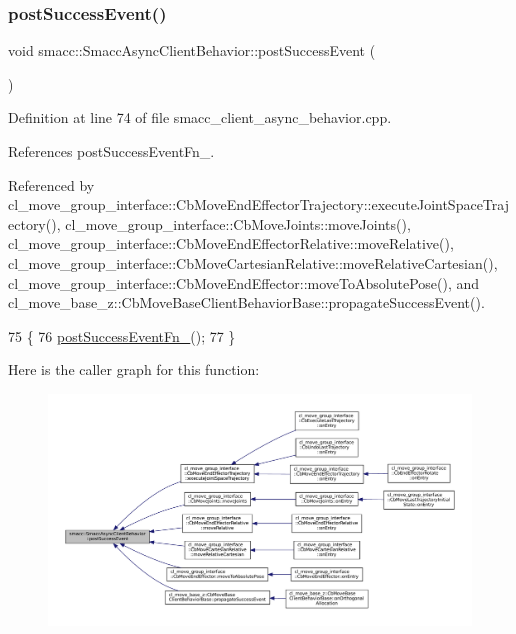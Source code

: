 \subsubsection{\texorpdfstring{post\+Success\+Event()}{postSuccessEvent()}}
{\footnotesize\ttfamily void smacc\+::\+Smacc\+Async\+Client\+Behavior\+::post\+Success\+Event (\begin{DoxyParamCaption}{ }\end{DoxyParamCaption})\hspace{0.3cm}{\ttfamily [protected]}}



Definition at line 74 of file smacc\+\_\+client\+\_\+async\+\_\+behavior.\+cpp.



References post\+Success\+Event\+Fn\+\_\+.



Referenced by cl\+\_\+move\+\_\+group\+\_\+interface\+::\+Cb\+Move\+End\+Effector\+Trajectory\+::execute\+Joint\+Space\+Trajectory(), cl\+\_\+move\+\_\+group\+\_\+interface\+::\+Cb\+Move\+Joints\+::move\+Joints(), cl\+\_\+move\+\_\+group\+\_\+interface\+::\+Cb\+Move\+End\+Effector\+Relative\+::move\+Relative(), cl\+\_\+move\+\_\+group\+\_\+interface\+::\+Cb\+Move\+Cartesian\+Relative\+::move\+Relative\+Cartesian(), cl\+\_\+move\+\_\+group\+\_\+interface\+::\+Cb\+Move\+End\+Effector\+::move\+To\+Absolute\+Pose(), and cl\+\_\+move\+\_\+base\+\_\+z\+::\+Cb\+Move\+Base\+Client\+Behavior\+Base\+::propagate\+Success\+Event().


\begin{DoxyCode}
75     \{
76         \hyperlink{classsmacc_1_1SmaccAsyncClientBehavior_a944ed10880796d53649bee39dc1299c0}{postSuccessEventFn\_}();
77     \}
\end{DoxyCode}
Here is the caller graph for this function\+:
\nopagebreak
\begin{figure}[H]
\begin{center}
\leavevmode
\includegraphics[width=350pt]{classsmacc_1_1SmaccAsyncClientBehavior_adf18efe1f0e4eacc1277b8865a8a94b1_icgraph}
\end{center}
\end{figure}


